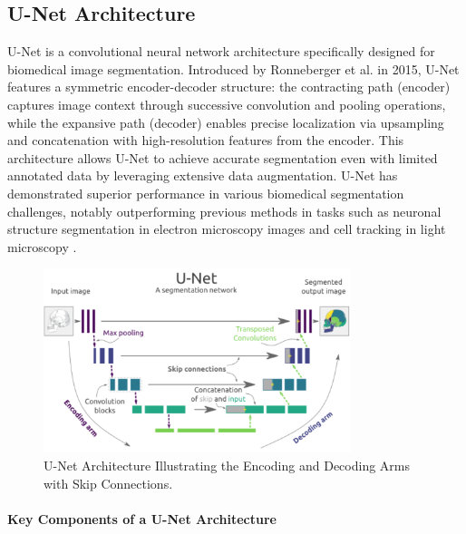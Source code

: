 \subsection{U-Net Architecture}
U-Net is a convolutional neural network architecture specifically designed for biomedical image segmentation. Introduced by Ronneberger et al. in 2015, U-Net features a symmetric encoder-decoder structure: the contracting path (encoder) captures image context through successive convolution and pooling operations, while the expansive path (decoder) enables precise localization via upsampling and concatenation with high-resolution features from the encoder. This architecture allows U-Net to achieve accurate segmentation even with limited annotated data by leveraging extensive data augmentation. U-Net has demonstrated superior performance in various biomedical segmentation challenges, notably outperforming previous methods in tasks such as neuronal structure segmentation in electron microscopy images and cell tracking in light microscopy \cite{ronneberger2015u}.

\begin{figure}[H]
  \centering
  \includegraphics[width=0.8\textwidth]{Images/Chapter1/unet2.png}
  \caption{U-Net Architecture Illustrating the Encoding and Decoding Arms with Skip Connections. \cite{zefs}}
  \label{fig:unet}
\end{figure}

\paragraph*{Key Components of a U-Net Architecture}

